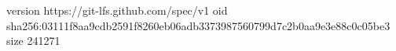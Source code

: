 version https://git-lfs.github.com/spec/v1
oid sha256:03111f8aa9cdb2591f8260eb06adb3373987560799d7c2b0aa9e3e88c0c05be3
size 241271

